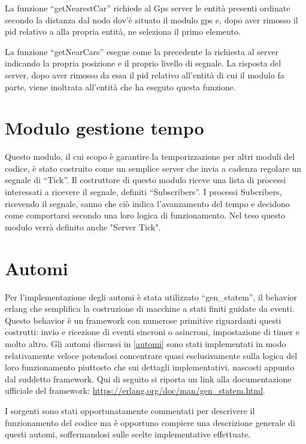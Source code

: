 La funzione ``getNearestCar'' richiede al Gps server le entità presenti ordinate secondo la distanza dal nodo dov'è situato il modulo gps e, dopo aver rimosso il pid relativo a alla propria entità, ne seleziona il primo elemento. 

La funzione ``getNearCars'' esegue come la precedente la richiesta al server indicando la propria posizione e il proprio livello di segnale. La risposta del server, dopo aver rimosso da essa il pid relativo all'entità di cui il modulo fa parte, viene inoltrata all'entità che ha eseguto questa funzione.

\section{Modulo gestione tempo} \label{moduloGestioneTempo}
Questo modulo, il cui scopo è garantire la temporizzazione per altri moduli del codice, è stato costruito come un semplice server che invia a cadenza regolare un segnale di ``Tick''. Il costruttore di questo modulo riceve una lista di processi interessati a ricevere il segnale, definiti ``Subscribers''. I processi Subcribers, ricevendo il segnale, sanno che ciò indica l'avanzamento del tempo e decidono come comportarsi secondo una loro logica di funzionamento.
Nel teso questo modulo verrà definito anche "Server Tick".

\section{Automi} \label{implementazioneAutomi}
Per l'implementazione degli automi è stata utilizzato ``gen\_statem'', il behavior erlang che semplifica la costruzione di macchine a stati finiti guidate da eventi. Questo behavior è un framework con numerose primitive riguardanti questi costrutti: invio e ricezione di eventi sincroni o asincroni, impostazione di timer e molto altro. Gli automi discussi in \ref{automi} sono stati implementati in modo relativamente veloce potendosi concentrare quasi esclusivamente sulla logica del loro funzionamento piuttosto che sui dettagli implementativi, nascosti appunto dal suddetto framework. 
Qui di seguito si riporta un link alla documentazione ufficiale del framework: \url{https://erlang.org/doc/man/gen_statem.html}.

I sorgenti sono stati opportunatamente commentati per descrivere il funzionamento del codice ma è opportuno compiere una descrizione generale di questi automi, soffermandosi sulle scelte implementative effettuate.

